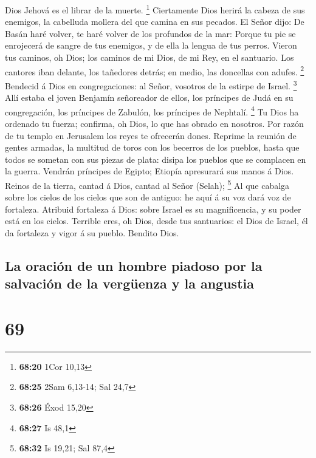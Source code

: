 Dios Jehová es el librar de la muerte. \footnote{\textbf{68:20} 1Cor
  10,13}  Ciertamente Dios herirá la cabeza de sus
enemigos, la cabelluda mollera del que camina en sus pecados.
 El Señor dijo: De Basán haré volver, te haré volver de los
profundos de la mar:  Porque tu pie se enrojecerá de sangre
de tus enemigos, y de ella la lengua de tus perros.  Vieron
tus caminos, oh Dios; los caminos de mi Dios, de mi Rey, en el
santuario.  Los cantores iban delante, los tañedores
detrás; en medio, las doncellas con adufes. \footnote{\textbf{68:25}
  2Sam 6,13-14; Sal 24,7}  Bendecid á Dios en
congregaciones: al Señor, vosotros de la estirpe de Israel. \footnote{\textbf{68:26}
  Éxod 15,20}  Allí estaba el joven Benjamín señoreador de
ellos, los príncipes de Judá en su congregación, los príncipes de
Zabulón, los príncipes de Nephtalí. \footnote{\textbf{68:27} Is 48,1}
 Tu Dios ha ordenado tu fuerza; confirma, oh Dios, lo que
has obrado en nosotros.  Por razón de tu templo en
Jerusalem los reyes te ofrecerán dones.  Reprime la reunión
de gentes armadas, la multitud de toros con los becerros de los pueblos,
hasta que todos se sometan con sus piezas de plata: disipa los pueblos
que se complacen en la guerra.  Vendrán príncipes de
Egipto; Etiopía apresurará sus manos á Dios.  Reinos de la
tierra, cantad á Dios, cantad al Señor (Selah); \footnote{\textbf{68:32}
  Is 19,21; Sal 87,4}  Al que cabalga sobre los cielos de
los cielos que son de antiguo: he aquí á su voz dará voz de fortaleza.
 Atribuid fortaleza á Dios: sobre Israel es su
magnificencia, y su poder está en los cielos.  Terrible
eres, oh Dios, desde tus santuarios: el Dios de Israel, él da fortaleza
y vigor á su pueblo. Bendito Dios.

\hypertarget{la-oraciuxf3n-de-un-hombre-piadoso-por-la-salvaciuxf3n-de-la-verguxfcenza-y-la-angustia}{%
\subsection{La oración de un hombre piadoso por la salvación de la
vergüenza y la
angustia}\label{la-oraciuxf3n-de-un-hombre-piadoso-por-la-salvaciuxf3n-de-la-verguxfcenza-y-la-angustia}}

\hypertarget{section-68}{%
\section{69}\label{section-68}}

